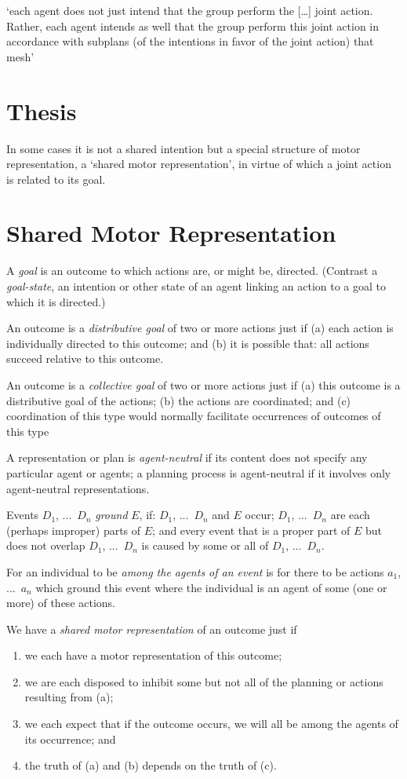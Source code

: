 \documentclass[12pt]{extarticle}
\begin{document}
\begin{multicols}{3}
`each agent does not just intend that the group perform the […] joint action. Rather, each agent intends as well that the group perform this joint action in accordance with subplans (of the intentions in favor of the joint action) that mesh'\citep%
{Bratman:1992mi}


\section{Thesis}
In some cases 
	it is not a shared intention 
	but a special structure of motor representation,
	a `shared motor representation',
	in virtue of which a joint action is related to its goal.


\section{Shared Motor Representation}

A \emph{goal} is an outcome to which actions are, or might be, directed.  (Contrast a \emph{goal-state}, an intention or other state of an agent linking an action to a goal to which it is directed.)

An outcome is a \emph{distributive goal} of two or more actions  just if 
(a) each action is individually directed to this outcome; and 
(b) it is possible that: all actions succeed relative to this outcome.

An outcome is a \emph{collective goal} of two or more actions just if
(a) this outcome is a distributive goal of the actions;
(b) the actions are coordinated; and 
(c) coordination of this type would normally  facilitate occurrences of outcomes of this type



A representation or plan is \emph{agent-neutral} if its content does not specify any particular agent or agents; a planning process is agent-neutral if it involves only agent-neutral representations.

Events $D_1$, ...\ $D_n$ \emph{ground} $E$, if: $D_1$, ...\ $D_n$ and $E$ occur; 
$D_1$, ...\ $D_n$ are each (perhaps improper) parts of $E$; and 
every event that is a proper part of $E$ but does not overlap  $D_1$, ...\ $D_n$ is caused by some or all of $D_1$, ...\ $D_n$.

For an individual to be \emph{among the agents of an event} is for there to be actions $a_1$, ...\ $a_n$ which ground this event where the individual is an agent of some (one or more) of these actions.

We have a \emph{shared motor representation} of an outcome just if 
\begin{enumerate}[label=\emph{\alph*}),itemsep=0pt,topsep=0pt]
\item we each have a motor representation of this outcome; 
\item we are each disposed to inhibit some but not all of the planning or actions resulting from (a);
\item  we each expect that if the outcome occurs, we will all be among the agents of its occurrence; and
\item the truth of (a) and (b) depends on the truth of (c).
\end{enumerate}


\end{multicols}
\end{document}
